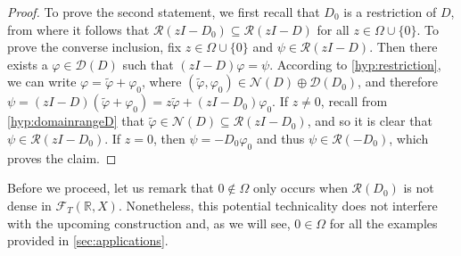 \documentclass[english]{myarticle}
\begin{document}
\begin{sloppypar}
\begin{proof}
To prove the second statement, we first recall that $D_0$ is a restriction of $D$, from where it follows that $\mathcal{R}(zI - D_0) \subseteq \mathcal{R}(zI - D)$ for all $z \in \Omega \cup \{0 \}$.
To prove the converse inclusion, fix $z \in \Omega \cup \{0\}$ and $\psi \in \mathcal{R}(zI-D)$. Then there exists a $\varphi \in \mathcal{D}(D)$ such that $(zI-D) \varphi = \psi$. According to \ref{hyp:restriction}, we can write $\varphi = \tilde{\varphi} + \varphi_0$, where $(\tilde{\varphi},\varphi_0) \in \mathcal{N}(D) \oplus \mathcal{D}(D_0)$, and therefore $\psi = (zI - D)(\tilde{\varphi} + \varphi_0) = z\tilde{\varphi} + (zI-D_0)\varphi_0$. If $z \neq 0$, recall from \ref{hyp:domainrangeD} that $\tilde{\varphi} \in \mathcal{N}(D) \subseteq \mathcal{R}(zI-D_0)$, and so it is clear that $\psi \in \mathcal{R}(zI-D_0)$. If $z=0$, then $\psi = -D_0\varphi_0$ and thus $\psi \in \mathcal{R}(-D_0)$, which proves the claim.
\end{proof}

Before we proceed, let us remark that $0 \notin \Omega$ only occurs when $\mathcal{R}(D_0)$ is not dense in $\mathcal{F}_T(\mathbb{R},X)$. Nonetheless, this potential technicality does not interfere with the upcoming construction and, as we will see, $0 \in \Omega$ for all the examples provided in \cref{sec:applications}.


\end{sloppypar}
\end{document}
